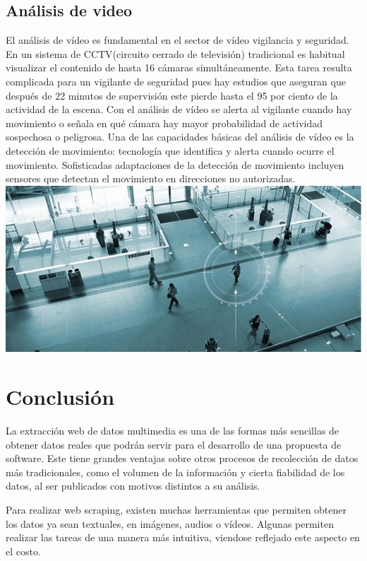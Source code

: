 \documentclass[twocolumn]{article}
\begin{document}
\subsection{Análisis de video}
El análisis de vídeo es fundamental en el sector de vídeo vigilancia y seguridad. En un sistema de CCTV(circuito cerrado de televisión) tradicional es habitual visualizar el contenido de hasta 16 cámaras simultáneamente. Esta tarea resulta complicada para un vigilante de seguridad pues hay estudios que aseguran que después de 22 minutos de supervisión este pierde hasta el 95 por ciento de la actividad de la escena. Con el análisis de vídeo se alerta al vigilante cuando hay movimiento o señala en qué cámara hay mayor probabilidad de actividad sospechosa o peligrosa.
Una de las capacidades básicas del análisis de vídeo es la detección de movimiento: tecnología que identifica y alerta cuando ocurre el movimiento. Sofisticadas adaptaciones de la detección de movimiento incluyen sensores que detectan el movimiento en direcciones no autorizadas.
\\
\includegraphics[width=1.02\linewidth]{img/video.jpg}

\section{Conclusión}

La extracción web de datos multimedia es una de las formas más sencillas de obtener datos reales que podrán servir para el desarrollo de una propuesta de software. Este tiene grandes ventajas sobre otros procesos de recolección de datos más tradicionales, como el volumen de la información y cierta fiabilidad de los datos, al ser publicados con motivos distintos a su análisis.

Para realizar web scraping, existen muchas herramientas que permiten obtener los datos ya sean textuales, en imágenes, audios o vídeos. Algunas permiten realizar las tareas de una manera más intuitiva, viendose reflejado este aspecto en el costo.
\end{document}
